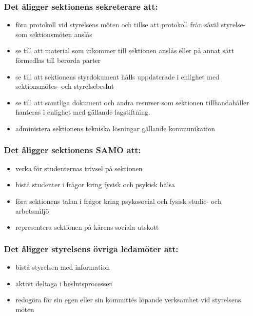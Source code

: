 \subsubsection{Det åligger sektionens sekreterare att:}

\begin{itemize}
  \item föra protokoll vid styrelsens möten och tillse att protokoll från såväl styrelse- som sektionsmöten anslås
  \item se till att material som inkommer till sektionen anslås eller på annat sätt förmedlas till berörda parter
  \item se till att sektionens styrdokument hålls uppdaterade i enlighet med sektionsmötes- och styrelsebeslut
  \item se till att samtliga dokument och andra resurser som sektionen tillhandahåller hanteras i enlighet med gällande lagstiftning.
  \item administera sektionens tekniska lösningar gällande kommunikation
\end{itemize}

\subsubsection{Det åligger sektionens SAMO att:}

\begin{itemize}
    \item verka för studenternas trivsel på sektionen
    \item bistå studenter i frågor kring fysisk och psykisk hälsa
    \item föra sektionens talan i frågor kring psykosocial och fysisk studie- och arbetsmiljö
    \item representera sektionen på kårens sociala utskott
\end{itemize}

\subsubsection{Det åligger styrelsens övriga ledamöter att:}

\begin{itemize}
  \item bistå styrelsen med information 
  \item aktivt deltaga i beslutsprocessen 
  \item redogöra för sin egen eller sin kommittés löpande verksamhet vid styrelsens möten 
\end{itemize}

